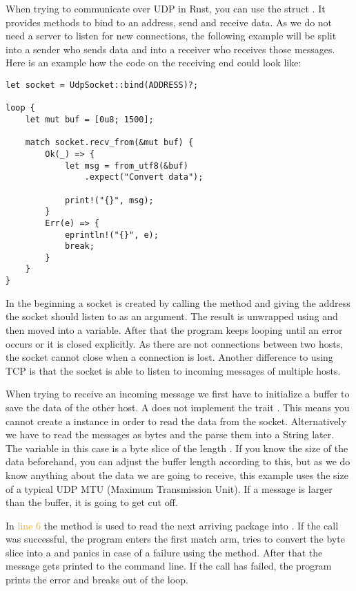 When trying to communicate over UDP in Rust, you can use the struct . It provides methods to
bind to an address, send and receive data. As we do not need a server to listen for new connections, the following
example will be split into a sender who sends data and into a receiver who receives those messages. Here is an example
how the code on the receiving end could look like:

\begin{verbatim}
let socket = UdpSocket::bind(ADDRESS)?;

loop {
    let mut buf = [0u8; 1500];

    match socket.recv_from(&mut buf) {
        Ok(_) => {
            let msg = from_utf8(&buf)
                .expect("Convert data");

            print!("{}", msg);
        }
        Err(e) => {
            eprintln!("{}", e);
            break;
        }
    }
}
\end{verbatim}

In the beginning a socket is created by calling the  method and giving the address the socket should listen
to as an argument. The result is unwrapped using  and then moved into a variable. After that the program keeps
looping until an error occurs or it is closed explicitly. As there are not connections between two hosts, the socket
cannot close when a connection is lost. Another difference to using TCP is that the socket is able to listen to
incoming messages of multiple hosts.

When trying to receive an incoming message we first have to initialize a buffer to save the data of the other host.
A  does not implement the trait . This means you cannot create a 
instance in order to read the data from the socket. Alternatively we have to read the messages as bytes and the parse
them into a String later. The variable  in this case is a byte slice of the length . If you know
the size of the data beforehand, you can adjust the buffer length according to this, but as we do know anything about
the data we are going to receive, this example uses the size of a typical UDP MTU (Maximum Transmission Unit). If a
message is larger than the buffer, it is going to get cut off.

In \textcolor{orange}{line 6} the method  is used to read the next arriving package into . If
the call was successful, the program enters the first match arm, tries to convert the byte slice into a  and
panics in case of a failure using the  method. After that the message gets printed to the command line. If
the call has failed, the program prints the error and breaks out of the loop.

